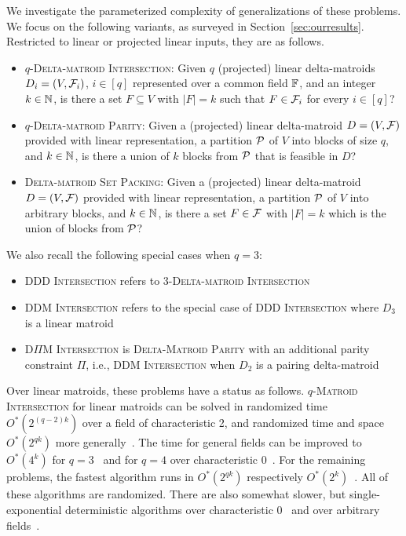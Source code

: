 We investigate the parameterized complexity of generalizations of
these problems. We focus on the following variants, as surveyed in Section~\ref{sec:ourresults}.
Restricted to linear or projected linear inputs, they are as follows. 
\begin{itemize}
\item \textsc{$q$-Delta-matroid Intersection}:
  Given $q$ (projected) linear delta-matroids $D_i=(V,\mathcal F_i)$, $i \in [q]$
  represented over a common field $\mathbb F$, and an integer $k \in \mathbb N$,
  is there a set $F \subseteq V$ with $|F|=k$ such that $F \in \mathcal F_i$
  for every $i \in [q]$?
\item \textsc{$q$-Delta-matroid Parity}:
  Given a (projected) linear delta-matroid $D=(V,\mathcal F)$ provided with linear
  representation, a partition $\mathcal P$ of $V$ into blocks of size $q$,
  and $k \in \mathbb N$, is there a union of $k$ blocks from $\mathcal P$ that is
  feasible in $D$? 
\item \textsc{Delta-matroid Set Packing}:
  Given a (projected) linear delta-matroid $D=(V,\mathcal F)$ provided with linear
  representation, a partition $\mathcal P$ of $V$ into arbitrary blocks,
  and $k \in \mathbb N$, is there a set $F \in \mathcal F$ with $|F|=k$ which is the 
  union of blocks from $\mathcal P$?
\end{itemize}
We also recall the following special cases when $q=3$:
\begin{itemize}
\item \textsc{DDD Intersection} refers to \textsc{3-Delta-matroid Intersection}
\item \textsc{DDM Intersection} refers to the special case of
  \textsc{DDD Intersection} where $D_3$ is a linear matroid
\item \textsc{D$\Pi$M Intersection} is \textsc{Delta-Matroid Parity}
  with an additional parity constraint $\Pi$, i.e.,
  \textsc{DDM Intersection} when $D_2$ is a pairing delta-matroid
\end{itemize}
Over linear matroids, these problems have a status as follows.
\textsc{$q$-Matroid Intersection} for linear matroids can be solved in
randomized time $O^*(2^{(q-2)k})$ over a field of characteristic 2, and
randomized time and space $O^*(2^{qk})$ more generally~\cite{EKW23}.
The time for general fields can be improved to $O^*(4^k)$ for $q=3$~\cite{EKW23,BrandKS23}
and for $q=4$ over characteristic 0~\cite{BrandKS23}.
For the remaining problems, the fastest algorithm runs in $O^*(2^{qk})$
respectively $O^*(2^k)$~\cite{EKW23}.
All of these algorithms are randomized.
There are also somewhat slower, but single-exponential deterministic
algorithms over characteristic 0~\cite{BrandP21}
and over arbitrary fields~\cite{FominLPS16JACM}.

